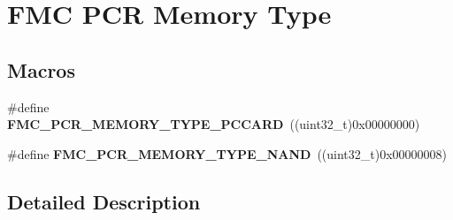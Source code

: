 \hypertarget{group___f_m_c___p_c_r___memory___type}{}\section{F\+MC P\+CR Memory Type}
\label{group___f_m_c___p_c_r___memory___type}
\subsection*{Macros}
\begin{DoxyCompactItemize}
\item 
\#define {\bfseries F\+M\+C\+\_\+\+P\+C\+R\+\_\+\+M\+E\+M\+O\+R\+Y\+\_\+\+T\+Y\+P\+E\+\_\+\+P\+C\+C\+A\+RD}~((uint32\+\_\+t)0x00000000)\hypertarget{group___f_m_c___p_c_r___memory___type_gac7c51d64c5f5caf8ff90adb60dc4ad5b}{}\label{group___f_m_c___p_c_r___memory___type_gac7c51d64c5f5caf8ff90adb60dc4ad5b}

\item 
\#define {\bfseries F\+M\+C\+\_\+\+P\+C\+R\+\_\+\+M\+E\+M\+O\+R\+Y\+\_\+\+T\+Y\+P\+E\+\_\+\+N\+A\+ND}~((uint32\+\_\+t)0x00000008)\hypertarget{group___f_m_c___p_c_r___memory___type_ga5c234a89c5d925a16c55eeee5d5173b2}{}\label{group___f_m_c___p_c_r___memory___type_ga5c234a89c5d925a16c55eeee5d5173b2}

\end{DoxyCompactItemize}


\subsection{Detailed Description}
